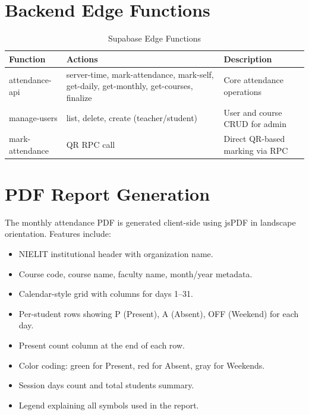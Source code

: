\documentclass{SOICTthesis}
\begin{document}
\section{Backend Edge Functions}
\label{sec:edge_functions}

\begin{table}[H]
\centering
\caption{Supabase Edge Functions}
\label{tab:edge_functions}
\begin{tabular}{|p{3cm}|p{5cm}|p{4.5cm}|}
    \hline
    \textbf{Function} & \textbf{Actions} & \textbf{Description} \\
    \hline
    attendance-api & server-time, mark-attendance, mark-self, get-daily, get-monthly, get-courses, finalize & Core attendance operations \\
    \hline
    manage-users & list, delete, create (teacher/student) & User and course CRUD for admin \\
    \hline
    mark-attendance & QR RPC call & Direct QR-based marking via RPC \\
    \hline
\end{tabular}
\end{table}

\section{PDF Report Generation}
\label{sec:pdf_generation}

The monthly attendance PDF is generated client-side using jsPDF in landscape orientation. Features include:

\begin{itemize}
    \item NIELIT institutional header with organization name.
    \item Course code, course name, faculty name, month/year metadata.
    \item Calendar-style grid with columns for days 1--31.
    \item Per-student rows showing P (Present), A (Absent), OFF (Weekend) for each day.
    \item Present count column at the end of each row.
    \item Color coding: green for Present, red for Absent, gray for Weekends.
    \item Session days count and total students summary.
    \item Legend explaining all symbols used in the report.
\end{itemize}
\end{document}
